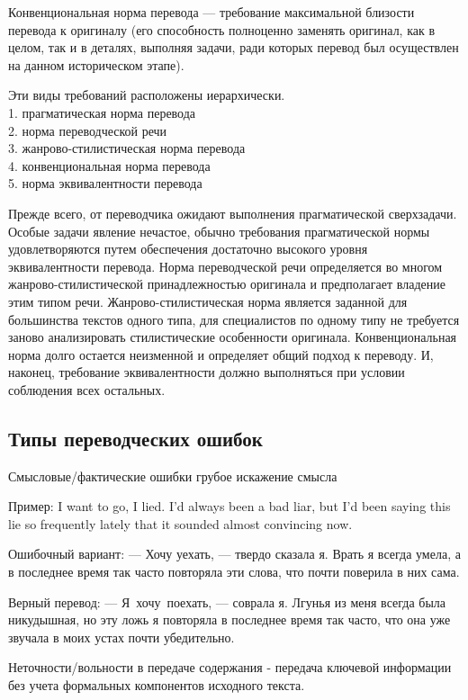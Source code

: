 Конвенциональная норма перевода --- требование максимальной близости перевода к оригиналу (его способность полноценно заменять оригинал, как в целом, так и в деталях, выполняя задачи, ради которых перевод был осуществлен на данном историческом этапе).  

Эти виды требований расположены иерархически. 
\\
1. прагматическая норма перевода
\\
2. норма переводческой речи
\\
3. жанрово-стилистическая норма перевода
\\
4. конвенциональная норма перевода
\\
5. норма эквивалентности перевода

Прежде всего, от переводчика ожидают выполнения прагматической сверхзадачи. Особые задачи  явление нечастое, обычно требования прагматической нормы удовлетворяются путем обеспечения достаточно высокого уровня эквивалентности перевода. Норма переводческой речи определяется во многом жанрово-стилистической принадлежностью оригинала и предполагает владение этим типом речи. Жанрово-стилистическая норма является заданной для большинства текстов одного типа, для специалистов по одному типу не требуется заново анализировать стилистические особенности оригинала. Конвенциональная норма долго остается неизменной и определяет общий подход к переводу. И, наконец, требование эквивалентности должно выполняться при условии соблюдения всех остальных. 

\subsection*{Типы переводческих ошибок}

Смысловые/фактические ошибки  грубое искажение смысла

Пример: I want to go, I lied. I'd always been a bad liar, but I'd been saying this lie so frequently lately that it sounded almost convincing now. 

Ошибочный вариант: --- Хочу уехать, --- твердо сказала я. Врать я всегда умела, а в последнее время так часто повторяла эти слова, что почти поверила в них сама.

Верный перевод: --- Я хочу поехать, --- соврала я. Лгунья из меня всегда была никудышная, но эту ложь я повторяла в последнее время так часто, что она уже звучала в моих устах почти убедительно. 

Неточности/вольности в передаче содержания - передача ключевой информации без учета формальных компонентов исходного текста.

